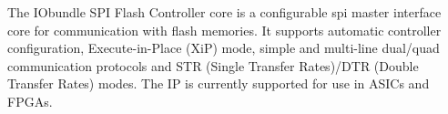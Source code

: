 The IObundle SPI Flash Controller core is a configurable spi master interface core
for communication with flash memories. It supports automatic controller configuration,
Execute-in-Place (XiP) mode, simple and multi-line dual/quad communication protocols
and STR (Single Transfer Rates)/DTR (Double Transfer Rates) modes. 
The IP is currently supported for use in ASICs and FPGAs.
